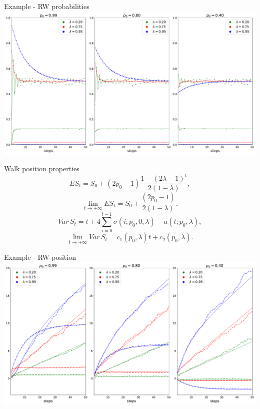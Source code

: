 \documentclass[american]{beamer}
\begin{document}
    \begin{frame}{Example - RW probabilities}
        \includegraphics[width=1\textwidth]{../../simulations/e_probability_1000_walks_50_steps_type_success_punished}
    \end{frame}

    \begin{frame}{Walk position properties}
        \[
            ES_{t}=S_{0}+(2p_{0}-1)\frac{1-(2\lambda-1)^{t}}{2(1-\lambda)},
        \]
        \[
            \lim_{t\to+\infty}ES_{t}=S_{0}+\frac{(2p_{0}-1)}{2(1-\lambda)}.
        \]
        \[
            Var\,S_{t}=t+4\sum_{i=0}^{t-1}\sigma(i;p_{0},0,\lambda)-a(t;p_{0},\lambda),
        \]
        \[
            \lim_{t\to+\infty}Var\,S_{t}=c_{1}(p_{0},\lambda)t+c_{2}(p_{0},\lambda).
        \]
    \end{frame}

    \begin{frame}{Example - RW position}
        \includegraphics[width=1\textwidth]{../../simulations/e_position_1000_walks_50_steps_type_success_punished}
    \end{frame}
\end{document}
